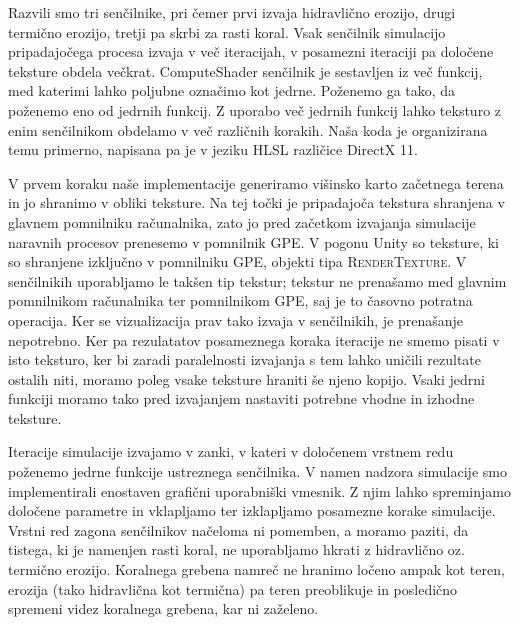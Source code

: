 \documentclass[9pt]{style/friteza}
\begin{document}
Razvili smo tri senčilnike, pri čemer prvi izvaja hidravlično erozijo, drugi termično erozijo, tretji pa skrbi za rasti koral. Vsak senčilnik simulacijo pripadajočega procesa izvaja v več iteracijah, v posamezni iteraciji pa določene teksture obdela večkrat. ComputeShader senčilnik je sestavljen iz več funkcij, med katerimi lahko poljubne označimo kot jedrne. Poženemo ga tako, da poženemo eno od jedrnih funkcij. Z uporabo več jedrnih funkcij lahko teksturo z enim senčilnikom obdelamo v več različnih korakih. Naša koda je organizirana temu primerno, napisana pa je v jeziku HLSL različice DirectX 11.

V prvem koraku naše implementacije generiramo višinsko karto začetnega terena in jo shranimo v obliki teksture. Na tej točki je pripadajoča tekstura shranjena v glavnem pomnilniku računalnika, zato jo pred začetkom izvajanja simulacije naravnih procesov prenesemo v pomnilnik GPE. V pogonu Unity so teksture, ki so shranjene izključno v pomnilniku GPE, objekti tipa \textsc{RenderTexture}. V senčilnikih uporabljamo le takšen tip tekstur; tekstur ne prenašamo med glavnim pomnilnikom računalnika ter pomnilnikom GPE, saj je to časovno potratna operacija. Ker se vizualizacija prav tako izvaja v senčilnikih, je prenašanje nepotrebno. Ker pa rezulatatov posameznega koraka iteracije ne smemo pisati v isto teksturo, ker bi zaradi paralelnosti izvajanja s tem lahko uničili rezultate ostalih niti, moramo poleg vsake teksture hraniti še njeno kopijo. Vsaki jedrni funkciji moramo tako pred izvajanjem nastaviti potrebne vhodne in izhodne teksture.

Iteracije simulacije izvajamo v zanki, v kateri v določenem vrstnem redu poženemo jedrne funkcije ustreznega senčilnika. V namen nadzora simulacije smo implementirali enostaven grafični uporabniški vmesnik. Z njim lahko spreminjamo določene parametre in vklapljamo ter izklapljamo posamezne korake simulacije. Vrstni red zagona senčilnikov načeloma ni pomemben, a moramo paziti, da tistega, ki je namenjen rasti koral, ne uporabljamo hkrati z hidravlično oz. termično erozijo. Koralnega grebena namreč ne hranimo ločeno ampak kot teren, erozija (tako hidravlična kot termična) pa teren preoblikuje in posledično spremeni videz koralnega grebena, kar ni zaželeno.
\end{document}
